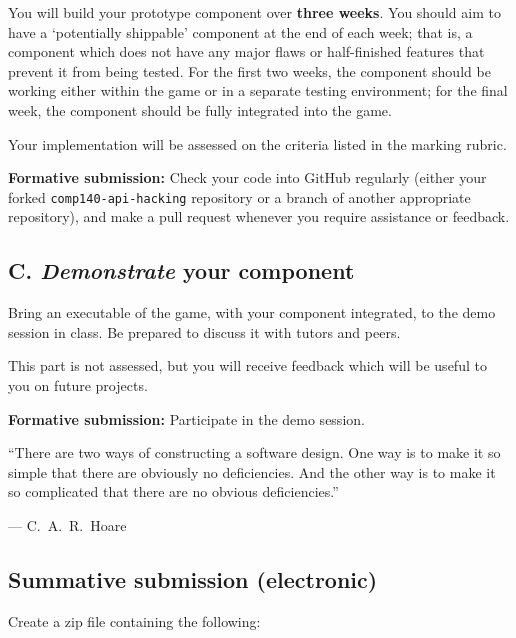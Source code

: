 \documentclass{../fal_assignment}
\begin{document}
You will build your prototype component over \textbf{three weeks}.
You should aim to have a `potentially shippable' component at the end of each week;
that is, a component which does not have any major flaws or half-finished features that prevent it from being tested.
For the first two weeks, the component should be working either within the game or in a separate testing environment;
for the final week, the component should be fully integrated into the game.

Your implementation will be assessed on the criteria listed in the marking rubric.

\textbf{Formative submission:} 
Check your code into GitHub regularly (either your forked \texttt{comp140-api-hacking} repository or a branch of another appropriate repository),
and make a pull request whenever you require assistance or feedback.

\subsection*{C. \emph{Demonstrate} your component}

Bring an executable of the game, with your component integrated, to the demo session in class.
Be prepared to discuss it with tutors and peers.

This part is not assessed, but you will receive feedback which will be useful to you on future projects.

\textbf{Formative submission:} Participate in the demo session.

\begin{marginquote}
    ``There are two ways of constructing a software design.
        One way is to make it so simple that there are obviously no deficiencies.
        And the other way is to make it so complicated that there are no obvious deficiencies.''
    
    --- C.\ A.\ R.\ Hoare
\end{marginquote}

\subsection*{Summative submission (electronic)}

Create a zip file containing the following:
\end{document}
